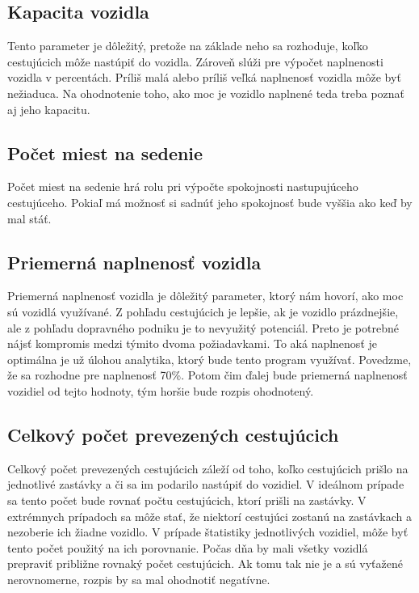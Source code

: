 \subsection*{Kapacita vozidla}
Tento parameter je dôležitý, pretože na základe neho sa rozhoduje, koľko cestujúcich môže nastúpiť do vozidla.
Zároveň slúži pre výpočet naplnenosti vozidla v percentách.
Príliš malá alebo príliš veľká naplnenosť vozidla môže byť nežiaduca.
Na ohodnotenie toho, ako moc je vozidlo naplnené teda treba poznať aj jeho kapacitu.

\subsection*{Počet miest na sedenie}
Počet miest na sedenie hrá rolu pri výpočte spokojnosti nastupujúceho cestujúceho.
Pokiaľ má možnosť si sadnúť jeho spokojnosť bude vyššia ako keď by mal stáť.

\subsection*{Priemerná naplnenosť vozidla}
Priemerná naplnenosť vozidla je dôležitý parameter, ktorý nám hovorí, ako moc sú vozidlá využívané.
Z pohľadu cestujúcich je lepšie, ak je vozidlo prázdnejšie, ale z pohľadu dopravného podniku je to nevyužitý potenciál.
Preto je potrebné nájsť kompromis medzi týmito dvoma požiadavkami.
To aká naplnenosť je optimálna je už úlohou analytika, ktorý bude tento program využívať.
Povedzme, že sa rozhodne pre naplnenosť 70\%.
Potom čim ďalej bude priemerná naplnenosť vozidiel od tejto hodnoty, tým horšie bude rozpis ohodnotený.

\subsection*{Celkový počet prevezených cestujúcich}
Celkový počet prevezených cestujúcich záleží od toho, koľko cestujúcich prišlo na jednotlivé zastávky a či sa im podarilo nastúpiť do vozidiel.
V ideálnom prípade sa tento počet bude rovnať počtu cestujúcich, ktorí prišli na zastávky.
V extrémnych prípadoch sa môže stať, že niektorí cestujúci zostanú na zastávkach a nezoberie ich žiadne vozidlo.
V prípade štatistiky jednotlivých vozidiel, môže byť tento počet použitý na ich porovnanie.
Počas dňa by mali všetky vozidlá prepraviť približne rovnaký počet cestujúcich.
Ak tomu tak nie je a sú vyťažené nerovnomerne, rozpis by sa mal ohodnotiť negatívne.

